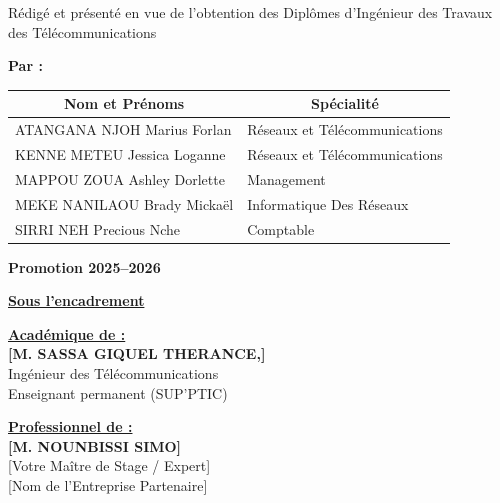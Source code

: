 \begin{titlepage}
\vspace{8pt}
{\sffamily\footnotesize Rédigé et présenté en vue de l'obtention des Diplômes d'Ingénieur des Travaux des Télécommunications\par}
\vspace{6pt}

{\sffamily\bfseries Par :\par}
\vspace{4pt}

\noindent\begin{tabular}{|l|l|}
\hline
\multicolumn{1}{|c|}{\sffamily\bfseries Nom et Prénoms} & \multicolumn{1}{c|}{\sffamily\bfseries Spécialité} \\ \hline
ATANGANA NJOH Marius Forlan & Réseaux et Télécommunications \\ \hline
KENNE METEU Jessica Loganne & Réseaux et Télécommunications \\ \hline
MAPPOU ZOUA Ashley Dorlette & Management \\ \hline
MEKE NANILAOU Brady Mickaël & Informatique Des Réseaux \\ \hline
SIRRI NEH Precious Nche & Comptable \\ \hline
\end{tabular}

\vspace{6pt}
{\sffamily\small\bfseries Promotion 2025--2026\par}
\vspace{4pt}
\underline{\sffamily\bfseries Sous l'encadrement}\par
\vspace{6pt}

\noindent\begin{minipage}[t]{0.48\textwidth}\centering\sffamily\footnotesize
\underline{\textbf{Académique de :}}\\[3pt]
\textbf{[M. SASSA GIQUEL THERANCE,]}\\[2pt]
Ingénieur des Télécommunications\\[2pt]
Enseignant permanent (SUP'PTIC)
\end{minipage}\hfill
\begin{minipage}[t]{0.48\textwidth}\centering\sffamily\footnotesize
\underline{\textbf{Professionnel de :}}\\[3pt]
\textbf{[M. NOUNBISSI SIMO]}\\[2pt]
[Votre Maître de Stage / Expert]\\[2pt]
[Nom de l'Entreprise Partenaire]
\end{minipage}

\vfill
{}
\end{titlepage}
\restoregeometry